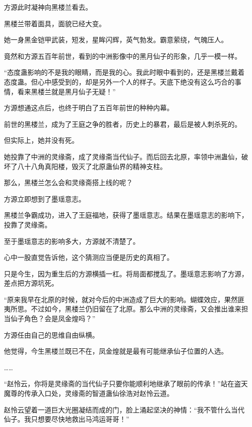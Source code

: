 
\begin{this_body}



方源此时凝神向黑楼兰看去。

黑楼兰带着面具，面貌已经大变。

她一身黑金铠甲武装，短发，星眸闪辉，英气勃发。霸意萦绕，气魄压人。

竟然和方源五百年前世，看到的中洲影像中的黑月仙子的形象，几乎一模一样。

“态度蛊影响的不是我的眼睛，而是我的心。我此时眼中看到的，还是黑楼兰戴着态度蛊。但心中感受到的，却是另外一个人的样子。天底下绝没有这么巧合的事情，看来黑楼兰就是黑月仙子无疑！”

方源想通这点后，也终于明白了五百年前世的种种内幕。

前世的黑楼兰，成为了王庭之争的胜者，历史上的暴君，最后是被人刺杀死的。

但实际上，她并没有死。

她投靠了中洲的灵缘斋，成了灵缘斋当代仙子。而后回去北原，率领中洲蛊仙，破坏了八十八角真阳楼，毁灭了北原蛊仙界的精神支柱。

那么，黑楼兰怎么会和灵缘斋搭上线的呢？

方源立即想到了墨瑶意志。

黑楼兰争霸成功，进入了王庭福地，获得了墨瑶意志。结果在墨瑶意志的影响下，投靠了灵缘斋。

至于墨瑶意志的影响多大，方源就不清楚了。

心中一股直觉告诉他，这个猜测应当便是历史的真相了。

只是今生，因为重生后的方源横插一杠。将局面都搅乱了。墨瑶意志影响了方源，差点把方源坑死。

“原来我早在北原的时候，就对今后的中洲造成了巨大的影响。蝴蝶效应，果然匪夷所思。不过如今，黑楼兰仍旧留在了北原。那么中洲的灵缘斋，又会推出谁来担当仙子角色？会是凤金煌吗？”

方源任由自己的思维自由纵横。

他觉得，今生黑楼兰既已不在，凤金煌就是最有可能继承仙子位置的人选。

……

“赵怜云，你将是灵缘斋的当代仙子只要你能顺利地继承了眼前的传承！”站在盗天魔尊的传承入口处，灵缘斋的智道蛊仙徐浩对赵怜云道。

赵怜云望着一道巨大光圈凝结而成的门，脸上涌起坚决的神情：“我不管什么当代仙子。我只想要尽快地救出马鸿运哥哥！”


\end{this_body}
